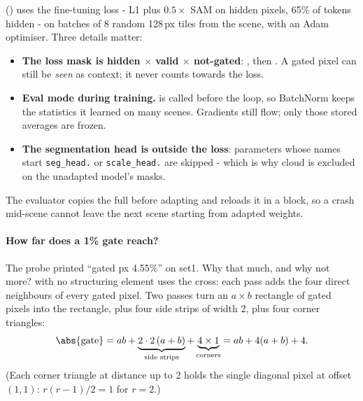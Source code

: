 () uses the fine-tuning loss - L1 plus $0.5 \times$ SAM on hidden
pixels, 65\% of tokens hidden - on batches of 8 random 128\,px tiles from the scene, with an Adam optimiser. Three details
matter:
\begin{itemize}
\item \textbf{The loss mask is hidden $\times$ valid $\times$ not-gated}: , then
  . A gated pixel can still be \emph{seen} as context; it never counts towards
  the loss.
\item \textbf{Eval mode during training.}  is called before the loop, so BatchNorm keeps the statistics it
  learned on many scenes. Gradients still flow; only those stored averages are frozen.
\item \textbf{The segmentation head is outside the loss}: parameters whose names start \texttt{seg\_head.} or
  \texttt{scale\_head.} are skipped - which is why cloud is excluded on the unadapted model's masks.
\end{itemize}
The evaluator copies the full  before adapting and reloads it in a  block, so a crash
mid-scene cannot leave the next scene starting from adapted weights.

\paragraph{How far does a 1\% gate reach?} 
The probe printed ``gated px 4.55\%'' on set1. Why that much, and why not more?  with no structuring
element uses the cross: each pass adds the four direct neighbours of every gated pixel. Two passes turn an $a \times b$
rectangle of gated pixels into the rectangle, plus four side strips of width 2, plus four corner triangles:
\begin{equation}
\abs{\text{gate}} = ab + \underbrace{2 \cdot 2\,(a + b)}_{\text{side strips}} + \underbrace{4 \times 1}_{\text{corners}}
= ab + 4(a + b) + 4 . \label{eq:scoringgains:dilate}
\end{equation}
(Each corner triangle at distance up to 2 holds the single diagonal pixel at offset $(1, 1)$: $r(r-1)/2 = 1$ for $r = 2$.)

